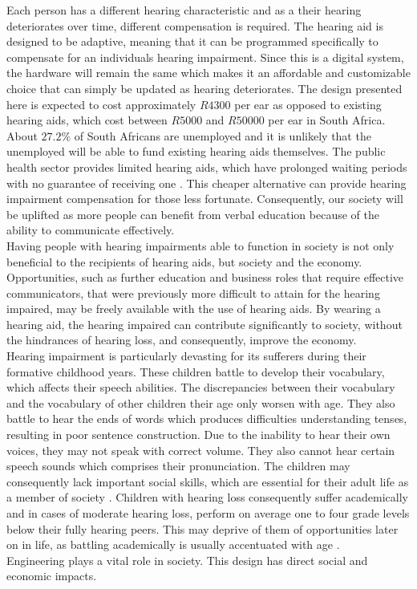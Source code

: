 \documentclass[11pt,onecolumn]{witseiepaper}
\begin{document}
\begin{appendices}
\noindent Each person has a different hearing characteristic and as a their hearing deteriorates over time, different compensation is required. The hearing aid is designed to be adaptive, meaning that it can be programmed specifically to  compensate for an individuals hearing impairment. Since this is a digital system, the hardware will remain the same which makes it an affordable and customizable choice that can simply be updated as hearing deteriorates. The design presented here is expected to cost approximately $R4300$ per ear as opposed to existing hearing aids, which cost between $R5000$ and $R50000$ per ear in South Africa. About $27.2\%$ of South Africans are unemployed and it is unlikely that the unemployed will be able to fund existing hearing aids themselves. The public health sector provides limited hearing aids, which have prolonged waiting periods with no guarantee of receiving one \cite{govAid}. This cheaper alternative can provide hearing impairment compensation for those less fortunate. Consequently, our society will be uplifted as more people can benefit from verbal education because of the ability to communicate effectively.\\
\newline
\noindent Having people with hearing impairments able to function in society is not only beneficial to the recipients of hearing aids, but society and the economy. Opportunities, such as further education and business roles that require effective communicators, that were previously more difficult to attain for the hearing impaired, may be freely available with the use of hearing aids. By wearing a hearing aid, the hearing impaired can contribute significantly to society, without the hindrances of hearing loss, and consequently, improve the economy. \\
\newline
\noindent Hearing impairment is particularly devasting for its sufferers during their formative childhood years. These children battle to develop their vocabulary, which affects their speech abilities. The discrepancies between their vocabulary and the vocabulary of other children their age only worsen with age. They also battle to hear the ends of words which produces difficulties understanding tenses, resulting in poor sentence construction. Due to the inability to hear their own voices, they may not speak with correct volume. They also cannot hear certain speech sounds which comprises their pronunciation.  The children may consequently lack important social skills, which are essential for their adult life as a member of society \cite{rock}. Children with hearing loss consequently suffer academically and in cases of moderate hearing loss, perform on average one to four grade levels below their fully hearing peers. This may deprive of them of opportunities later on in life, as battling academically is usually accentuated  with age \cite{rock}.\\
\newline
\noindent Engineering plays a vital role in society. This design has direct social and economic impacts. 

\end{appendices}
\end{document}
